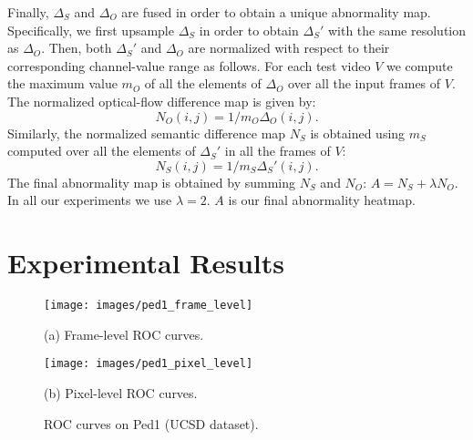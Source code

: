 \documentclass{article}
\begin{document}
	Finally, $\Delta_S$ and $\Delta_O$ are fused in order to obtain a unique abnormality map. Specifically, we first upsample $\Delta_S$ in order to obtain $\Delta_S'$ with the same resolution as $\Delta_O$. Then, both $\Delta_S'$ and $\Delta_O$ are normalized with respect to their corresponding channel-value range as follows. For each test video $V$
	we compute the maximum value $m_O$ of all the elements of $\Delta_O$ over all the input frames of $V$. The normalized optical-flow difference map is given by:
	\begin{equation}
	N_O(i,j) = 1/m_O \Delta_O(i,j).
	\end{equation}
	\noindent
	Similarly, the normalized semantic difference map $N_S$ is obtained using $m_S$ computed over all the elements of $\Delta_S'$ in all the frames of $V$:
\begin{equation}
	N_S(i,j) = 1/m_S \Delta_S'(i,j).
	\end{equation}
	The final abnormality map is obtained by summing $N_S$ and $N_O$: $A = N_S + \lambda N_O$. 
	In all our experiments we use $\lambda = 2$. $A$ is our final abnormality heatmap.
	\section{Experimental Results}
	\label{sec:exp}
	\begin{figure}
		


\begin{minipage}[b]{.49\linewidth}
			\centering
			\centerline{\texttt{[image: images/ped1\_frame\_level]}}
\centerline{\scriptsize(a) Frame-level ROC curves.}\medskip
		\end{minipage}
		\hfill
		\begin{minipage}[b]{0.49\linewidth}
			\centering
			\centerline{\texttt{[image: images/ped1\_pixel\_level]}}
\centerline{\scriptsize(b) Pixel-level ROC curves.}\medskip
		\end{minipage}
\caption{ROC curves on Ped1 (UCSD dataset).}
		\label{fig:rocfrm}
\end{figure}
	
\end{document}

